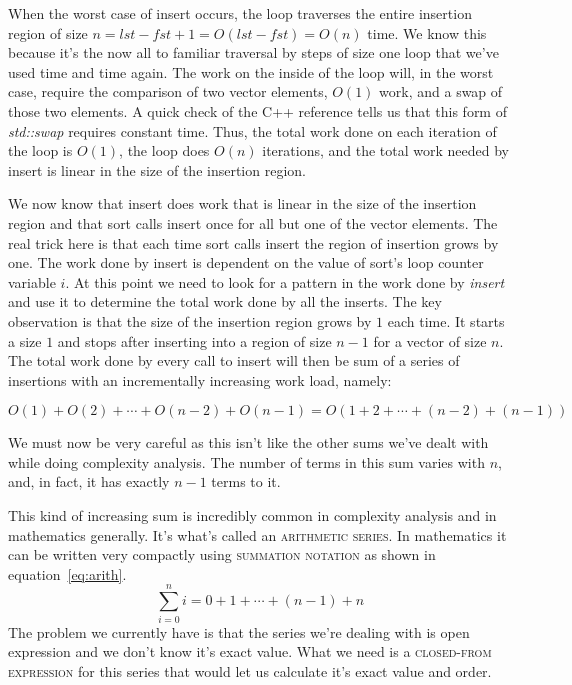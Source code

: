 \documentclass[]{tufte-handout}
\begin{document}
When the worst case of insert occurs, the loop traverses the entire insertion region of size $n=lst-fst+1=O(lst-fst)=O(n)$ time. We know this because it's the now all to familiar traversal by steps of size one loop that we've used time and time again. The work on the inside of the loop will, in the worst case, require the comparison of two vector elements, $O(1)$ work, and a swap of those two elements. A quick check of the C++ reference tells us that this form of \textit{std::swap} requires constant time. Thus, the total work done on each iteration of the loop is $O(1)$, the loop does $O(n)$ iterations, and the total work needed by insert is linear in the size of the insertion region.

We now know that insert does work that is linear in the size of the insertion region and that sort calls insert once for all but one of the vector elements. The real trick here is that each time sort calls insert the region of insertion grows by one. The work done by insert is dependent on the value of sort's loop counter variable $i$. At this point we need to look for a pattern in the work done by \textit{insert} and use it to determine the total work done by all the inserts. The key observation is that the size of the insertion region grows by $1$ each time. It starts a size $1$ and stops after inserting into a region of size $n-1$ for a vector of size $n$. The total work done by every call to insert will then be sum of a series of insertions with an incrementally increasing work load, namely:

\[
O(1) + O(2) + \cdots + O(n-2) + O(n-1) = O(1+2+\cdots+(n-2)+(n-1))
\]

We must now be very careful as this isn't like the other sums we've dealt with while doing complexity analysis. The number of terms in this sum varies with $n$, and, in fact, it has exactly $n-1$ terms to it.

This kind of increasing sum is incredibly common in complexity analysis and in mathematics generally. It's what's called an \textsc{arithmetic series}. In mathematics it can be written very compactly using \textsc{summation notation} as shown in equation~\ref{eq:arith}.
\begin{equation}
\sum\limits_{i=0}^{n} i = 0 + 1 + \cdots +(n-1) + n
\label{eq:arith}
\end{equation}
The problem we currently have is that the series we're dealing with is open expression and we don't know it's exact value. What we need is a \textsc{closed-from expression} for this series that would let us calculate it's exact value and order.
\end{document}
